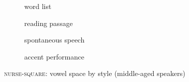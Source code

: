 \begin{figure}[b]
	
	\begin{subfigure}{.49\textwidth}
		
			\resizebox{\linewidth}{!}{} 
		\caption{word list}
		\label{fig.nurse.space.mid.list}
	\end{subfigure}
	\begin{subfigure}{.49\textwidth}
		
			\resizebox{\linewidth}{!}{} 
		\caption{reading passage}
		\label{fig.nurse.space.mid.read}
	\end{subfigure}
	
	\begin{subfigure}{.49\textwidth}
		
			\resizebox{\linewidth}{!}{} 
		\caption{spontaneous speech}
		\label{fig.nurse.space.mid.free}
	\end{subfigure}
	\begin{subfigure}{.49\textwidth}
		
			\resizebox{\linewidth}{!}{} 
		\caption{accent performance}
		\label{fig.nurse.space.mid.imit}
	\end{subfigure}
	
	\caption{\textsc{nurse}-\textsc{square}: vowel space by style (middle-aged speakers)}
	\label{fig.nurse.space.mid}
\end{figure}

